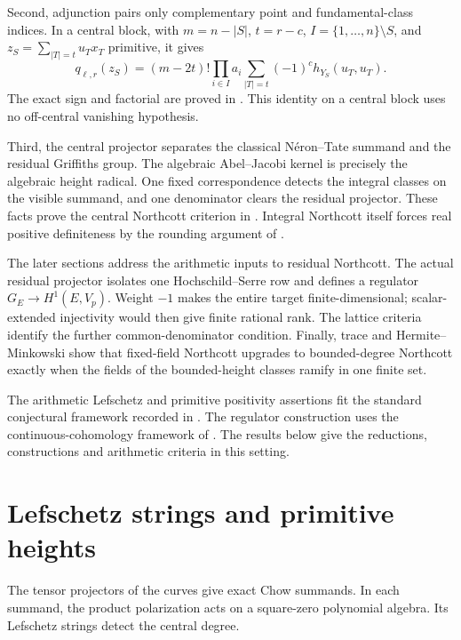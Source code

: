 \documentclass[11pt,a4paper]{article}
\theoremstyle{definition}
\DeclareRobustCommand{\MathSecref}[1]{\begingroup\hypersetup{linkcolor=MathSectionLink}\Cref{#1}\endgroup}
\numberwithin{equation}{section}
\begin{document}
Second, adjunction pairs only complementary point and
fundamental-class indices. In a central block, with
\(m=n-|S|\), \(t=r-c\), \(I=\{1,\ldots,n\}\setminus S\), and
\(z_S=\sum_{|T|=t}u_Tx_T\) primitive, it gives
\begin{equation}\label{eq:intro-squares}
 q_{\ell,r}(z_S)
   =(m-2t)!\prod_{i\in I}a_i
      \sum_{|T|=t}(-1)^c h_{Y_S}(u_T,u_T).
\end{equation}
The exact sign and factorial are proved in
\MathSecref{sec:primitive-proof}. This identity on a central
block uses no off-central vanishing hypothesis.

Third, the central projector separates the classical
Néron--Tate summand and the residual Griffiths group.
The algebraic Abel--Jacobi kernel is precisely the algebraic
height radical. One fixed correspondence detects the integral
classes on the visible summand, and one denominator clears the
residual projector. These facts prove the central Northcott
criterion in \MathSecref{sec:central-northcott}. Integral
Northcott itself forces real positive definiteness by the
rounding argument of .

The later sections address the arithmetic inputs to residual
Northcott. The actual residual projector isolates one
Hochschild--Serre row and defines a regulator
\(G_E\to H^1(E,V_p)\). Weight \(-1\) makes the entire target
finite-dimensional; scalar-extended injectivity would then give
finite rational rank. The lattice criteria identify the further
common-denominator condition. Finally, trace and
Hermite--Minkowski show that fixed-field Northcott upgrades to
bounded-degree Northcott exactly when the fields of the
bounded-height classes ramify in one finite set.

The arithmetic Lefschetz and primitive positivity assertions fit
the standard conjectural framework recorded in
\cite[Conjecture~2.3.1]{ZhangStandard}. The regulator construction
uses the continuous-cohomology framework of \cite{Raskind,Kahn}.
The results below give the reductions, constructions and arithmetic
criteria in this setting.


\section{Lefschetz strings and primitive heights}\label{sec:lefschetz}

The tensor projectors of the curves give exact Chow summands. In each
summand, the product polarization acts on a square-zero polynomial
algebra. Its Lefschetz strings detect the central degree.
\end{document}
